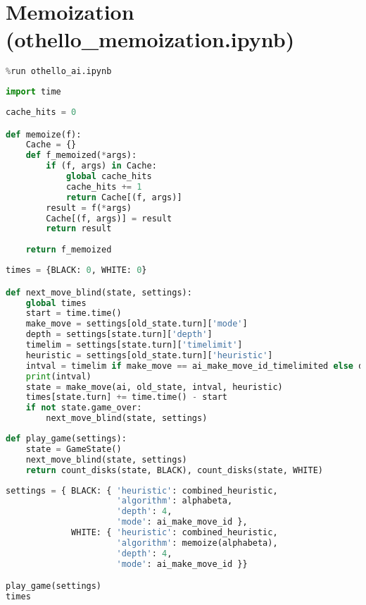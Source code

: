 \hypertarget{memoization-othello_memoization.ipynb}{%
\section{Memoization
(othello\_memoization.ipynb)}\label{memoization-othello_memoization.ipynb}}

\begin{lstlisting}[language=Python]
%run othello_game.ipynb
%run othello_ai.ipynb
\end{lstlisting}

\begin{lstlisting}[language=Python]
import time
\end{lstlisting}

\begin{lstlisting}[language=Python]
cache_hits = 0

def memoize(f):
    Cache = {}
    def f_memoized(*args):
        if (f, args) in Cache:
            global cache_hits
            cache_hits += 1
            return Cache[(f, args)]
        result = f(*args)
        Cache[(f, args)] = result
        return result
    
    return f_memoized
\end{lstlisting}

\begin{lstlisting}[language=Python]
times = {BLACK: 0, WHITE: 0}

def next_move_blind(state, settings):
    global times
    start = time.time()
    make_move = settings[old_state.turn]['mode']
    depth = settings[state.turn]['depth']
    timelim = settings[state.turn]['timelimit']
    heuristic = settings[old_state.turn]['heuristic']
    intval = timelim if make_move == ai_make_move_id_timelimited else depth
    print(intval)
    state = make_move(ai, old_state, intval, heuristic)
    times[state.turn] += time.time() - start
    if not state.game_over:
        next_move_blind(state, settings)
\end{lstlisting}

\begin{lstlisting}[language=Python]
def play_game(settings):
    state = GameState()
    next_move_blind(state, settings)
    return count_disks(state, BLACK), count_disks(state, WHITE)
\end{lstlisting}

\begin{lstlisting}[language=Python]
settings = { BLACK: { 'heuristic': combined_heuristic,
                      'algorithm': alphabeta,
                      'depth': 4,
                      'mode': ai_make_move_id },
             WHITE: { 'heuristic': combined_heuristic,
                      'algorithm': memoize(alphabeta),
                      'depth': 4,
                      'mode': ai_make_move_id }}

play_game(settings)
times
\end{lstlisting}

